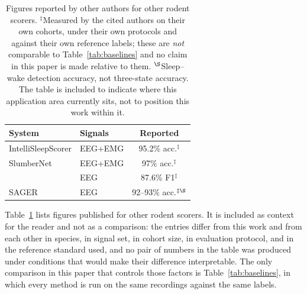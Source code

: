 \begin{table}[t]
\centering
\footnotesize
\setlength{\tabcolsep}{4pt}
\begin{tabular}{@{}llc@{}}
\toprule
\textbf{System} & \textbf{Signals} & \textbf{Reported} \\
\midrule
IntelliSleepScorer \citep{wang2023_intellisleepscorer} & EEG+EMG & 95.2\% acc.$^{\ddagger}$ \\
SlumberNet \citep{jha2024_slumbernet}                  & EEG+EMG & 97\% acc.$^{\ddagger}$ \\
\citet{smith2025_ratlstm}                              & EEG     & 87.6\% F1$^{\ddagger}$ \\
SAGER \citep{saevskiy2025_sensors}                     & EEG     & 92--93\% acc.$^{\ddagger\S}$ \\
\bottomrule
\end{tabular}
\caption{Figures reported by other authors for other rodent scorers.
$^{\ddagger}$Measured by the cited authors on their own cohorts, under
their own protocols and against their own reference labels; these are
\emph{not} comparable to Table~\ref{tab:baselines} and no claim in this
paper is made relative to them. $^{\S}$Sleep--wake detection accuracy,
not three-state accuracy. The table is included to indicate where this
application area currently sits, not to position this work within it.}
\label{tab:context}
\end{table}

Table~\ref{tab:context} lists figures published for other rodent scorers.
It is included as context for the reader and not as a comparison: the
entries differ from this work and from each other in species, in signal
set, in cohort size, in evaluation protocol, and in the reference
standard used, and no pair of numbers in the table was produced under
conditions that would make their difference interpretable. The only
comparison in this paper that controls those factors is
Table~\ref{tab:baselines}, in which every method is run on the same
recordings against the same labels.

